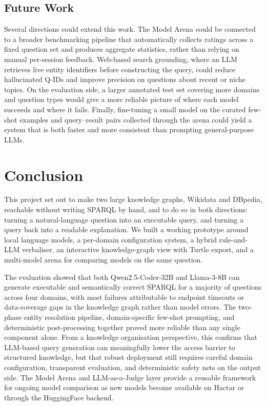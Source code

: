 \documentclass[11pt,a4paper]{article}
\begin{document}
\subsection{Future Work}
\label{sec:future-work}
Several directions could extend this work. The Model Arena could be connected to a broader benchmarking pipeline that automatically collects ratings across a fixed question set and produces aggregate statistics, rather than relying on manual per-session feedback. Web-based search grounding, where an LLM retrieves live entity identifiers before constructing the query, could reduce hallucinated Q-IDs and improve precision on questions about recent or niche topics. On the evaluation side, a larger annotated test set covering more domains and question types would give a more reliable picture of where each model succeeds and where it fails. Finally, fine-tuning a small model on the curated few-shot examples and query--result pairs collected through the arena could yield a system that is both faster and more consistent than prompting general-purpose LLMs.

\section{Conclusion}
\label{sec:conclusion}

This project set out to make two large knowledge graphs, Wikidata and
DBpedia, reachable without writing SPARQL by hand, and to do so in
both directions: turning a natural-language question into an
executable query, and turning a query back into a readable
explanation. We built a working prototype around local language
models, a per-domain configuration system, a hybrid rule-and-LLM
verbaliser, an interactive knowledge-graph view with Turtle export,
and a multi-model arena for comparing models on the same question.

The evaluation showed that both Qwen2.5-Coder-32B and Llama-3-8B can generate executable and semantically correct SPARQL for a majority of questions across four domains, with most failures attributable to endpoint timeouts or data-coverage gaps in the knowledge graph rather than model errors. The two-phase entity resolution pipeline, domain-specific few-shot prompting, and deterministic post-processing together proved more reliable than any single component alone. From a knowledge organisation perspective, this confirms that LLM-based query generation can meaningfully lower the access barrier to structured knowledge, but that robust deployment still requires careful domain configuration, transparent evaluation, and deterministic safety nets on the output side. The Model Arena and LLM-as-a-Judge layer provide a reusable framework for ongoing model comparison as new models become available on Hactar or through the HuggingFace backend.
\end{document}
